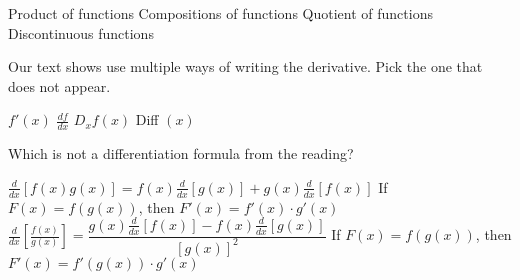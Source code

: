 \documentclass{exam}
\begin{document}
\begin{questions}
\begin{choices}
\choice Product of functions
\choice Compositions of functions
\choice Quotient of functions
\choice Discontinuous functions
\end{choices}
\question Our text shows use multiple ways of writing the derivative. Pick the one that does not appear.
\begin{choices}
\choice $f'(x)$
\choice $\frac{df}{dx}$
\choice $D_xf(x)$
\choice Diff $(x)$
\end{choices}
\question Which is not a differentiation formula from the reading?
\begin{choices}
\choice $\frac{d}{dx}[f(x)g(x)] = f(x) \frac{d}{dx}[g(x)] + g(x)\frac{d}{dx}[f(x)]$
\choice If $F(x) = f(g(x))$, then $F'(x) = f'(x)\cdot g'(x)$
\choice $\frac{d}{dx}\left[\frac{f(x)}{g(x)}\right] = \dfrac{g(x)\frac{d}{dx}[f(x)] - f(x)\frac{d}{dx}[g(x)]}{[g(x)]^2}$
\choice If $F(x) = f(g(x))$, then $F'(x) = f'(g(x))\cdot g'(x)$
\end{choices}
\end{questions}
\end{document}
